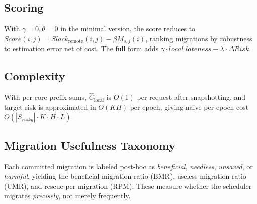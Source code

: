 \subsection{Scoring}
With $\gamma{=}0,\theta{=}0$ in the minimal version, the score reduces to
$Score(i,j)=Slack_{\text{remote}}(i,j)-\beta M_{s,j}(i)$, ranking
migrations by robustness to estimation error net of cost. The full form
adds $\gamma\cdot local\_lateness-\lambda\cdot\Delta Risk$.

\subsection{Complexity}
With per-core prefix sums, $\hat{C}_{\text{local}}$ is $O(1)$ per request
after snapshotting, and target risk is approximated in $O(KH)$ per epoch,
giving naive per-epoch cost $O(|S_{risky}|\cdot K\cdot H\cdot L)$.

\subsection{Migration Usefulness Taxonomy}
Each committed migration is labeled post-hoc as \emph{beneficial},
\emph{needless}, \emph{unsaved}, or \emph{harmful}, yielding the
beneficial-migration ratio (BMR), useless-migration ratio (UMR), and
rescue-per-migration (RPM). These measure whether the scheduler migrates
\emph{precisely}, not merely frequently.